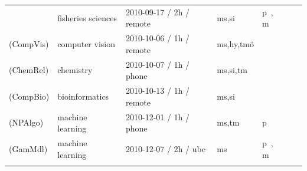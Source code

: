 \begin{table}
\begin{center}
\begin{tabular}{ | l | l | l | l | l | l | l |}
		& fisheries sciences\index{fisheries sciences} & 2010-09-17 / 2h / remote & {\sc ms,si} &  p~\cite{Booshehrian2012,Holt2011}, m
        
        \\
        
        \rowcolor{gray!15}
        
        {rownumber} 
		\therownumber\label{drvistasks:analyst:GM} ({\sc CompVis}) %
		
		& computer vision\index{computer vision} & 2010-10-06 / 1h / remote & {\sc ms,hy,tm\"{o}} &
        
        \\
        
        {rownumber} 
		\therownumber\label{drvistasks:analyst:KD} ({\sc ChemRel}) %
        
        & chemistry\index{chemistry} & 2010-10-07 / 1h / phone & {\sc ms,si,tm} &  
        
        \\
        
        \rowcolor{gray!15}
        
        {rownumber} 
		\therownumber\label{drvistasks:analyst:RB} ({\sc CompBio}) %
		
		& bioinformatics\index{bioinformatics} & 2010-10-13 / 1h / remote & {\sc ms,si} &
        
        \\
        
        {rownumber} 
		\therownumber\label{drvistasks:analyst:KLB} ({\sc NPAlgo}) %
        
        & machine learning\index{machine learning} & 2010-12-01 / 1h / phone & {\sc ms,tm} & p~\cite{Hutter2010a,Hutter2009,Hutter2010,Leyton-Brown2009}
        
        \\
        
        \rowcolor{gray!15}
        
        {rownumber} 
		\therownumber\label{drvistasks:analyst:JW} ({\sc GamMdl}) %
        
        & machine learning\index{machine learning} & 2010-12-07 / 2h / {\sc ubc} & {\sc ms} & p~\cite{Wright2006}, m
        
        \\
        
        \rowcolor{gray!15}
        

\end{tabular}
\end{center}
\end{table}
